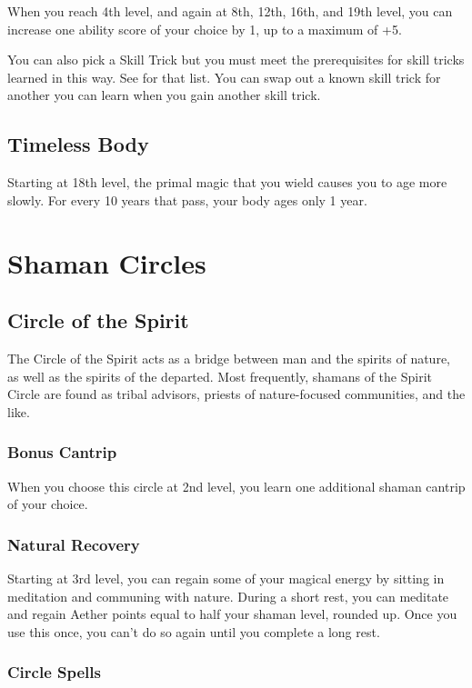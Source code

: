 When you reach 4th level, and again at 8th, 12th, 16th, and 19th level, you can increase one ability score of your choice by 1, up to a maximum of +5.

You can also pick a Skill Trick but you must meet the prerequisites for skill tricks learned in this way. See  for that list. You can swap out a known skill trick for another you can learn when you gain another skill trick.

\subsection{Timeless Body}

Starting at 18th level, the primal magic that you wield causes you to age more slowly. For every 10 years that pass, your body ages only 1 year.

\section{Shaman Circles}

\subsection{Circle of the Spirit}

The Circle of the Spirit acts as a bridge between man and the spirits of nature, as well as the spirits of the departed. Most frequently, shamans of the Spirit Circle are found as tribal advisors, priests of nature-focused communities, and the like.

\subsubsection{Bonus Cantrip}

When you choose this circle at 2nd level, you learn one additional shaman cantrip of your choice.

\subsubsection{Natural Recovery}

Starting at 3rd level, you can regain some of your magical energy by sitting in meditation and communing with nature. During a short rest, you can meditate and regain Aether points equal to half your shaman level, rounded up. Once you use this once, you can't do so again until you complete a long rest.

\subsubsection{Circle Spells}

